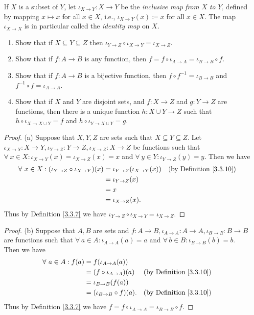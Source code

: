 \begin{exercise}\label{ex 3.3.8}
If \(X\) is a subset of \(Y\), let \(\iota_{X \to Y} : X \to Y\) be the \emph{inclusive map from \(X\) to \(Y\)}, defined by mapping \(x \mapsto x\) for all \(x \in X\), i.e., \(\iota_{X \to Y}(x) \coloneqq x\) for all \(x \in X\).
The map \(\iota_{X \to X}\) is in particular called the \emph{identity map} on \(X\).
\begin{enumerate}
    \item Show that if \(X \subseteq Y \subseteq Z\) then \(\iota_{Y \to Z} \circ \iota_{X \to Y} = \iota_{X \to Z}\).
    \item Show that if \(f : A \to B\) is any function, then \(f = f \circ \iota_{A \to A} = \iota_{B \to B} \circ f\).
    \item Show that if \(f : A \to B\) is a bijective function, then \(f \circ f^{-1} = \iota_{B \to B}\) and \(f^{-1} \circ f = \iota_{A \to A}\).
    \item Show that if \(X\) and \(Y\) are disjoint sets, and \(f : X \to Z\) and \(g : Y \to Z\) are functions, then there is a unique function \(h : X \cup Y \to Z\) such that \(h \circ \iota_{X \to X \cup Y} = f\) and \(h \circ \iota_{Y \to X \cup Y} = g\).
\end{enumerate}
\end{exercise}

\begin{proof}{(a)}
Suppose that \(X, Y, Z\) are sets such that \(X \subseteq Y \subseteq Z\).
Let \(\iota_{X \to Y} : X \to Y, \iota_{Y \to Z} : Y \to Z, \iota_{X \to Z} : X \to Z\) be functions such that \(\forall\ x \in X : \iota_{X \to Y}(x) = \iota_{X \to Z}(x) = x\) and \(\forall\ y \in Y : \iota_{Y \to Z}(y) = y\).
Then we have
\begin{align*}
\forall\ x \in X : (\iota_{Y \to Z} \circ \iota_{X \to Y})(x) &= \iota_{Y \to Z}(\iota_{X \to Y}(x)) & \text{(by Definition \ref{3.3.10})} \\
&= \iota_{Y \to Z}(x) \\
&= x \\
&= \iota_{X \to Z}(x).
\end{align*}
Thus by Definition \ref{3.3.7} we have \(\iota_{Y \to Z} \circ \iota_{X \to Y} = \iota_{X \to Z}\).
\end{proof}

\begin{proof}{(b)}
Suppose that \(A, B\) are sets and \(f : A \to B, \iota_{A \to A} : A \to A, \iota_{B \to B} : B \to B\) are functions such that \(\forall\ a \in A : \iota_{A \to A}(a) = a\) and \(\forall\ b \in B : \iota_{B \to B}(b) = b\).
Then we have
\begin{align*}
\forall\ a \in A : f(a) &= f(\iota_{A \to A}(a)) \\
&= (f \circ \iota_{A \to A})(a) & \text{(by Definition \ref{3.3.10})} \\
&= \iota_{B \to B}(f(a)) \\
&= (\iota_{B \to B} \circ f)(a). & \text{(by Definition \ref{3.3.10})}
\end{align*}
Thus by Definition \ref{3.3.7} we have \(f = f \circ \iota_{A \to A} = \iota_{B \to B} \circ f\).
\end{proof}

